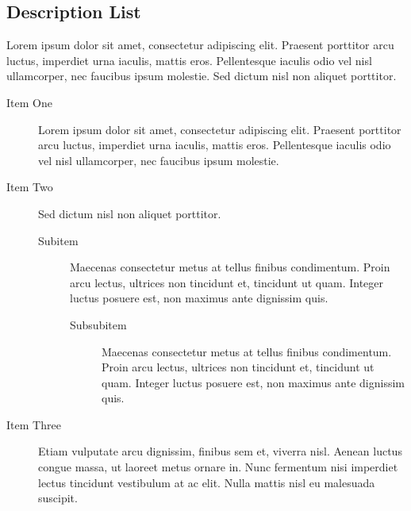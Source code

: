 
\subsection{Description List}

Lorem ipsum dolor sit amet, consectetur adipiscing elit. Praesent porttitor arcu luctus, imperdiet urna iaculis, mattis eros. Pellentesque iaculis odio vel nisl ullamcorper, nec faucibus ipsum molestie. Sed dictum nisl non aliquet porttitor.

\begin{description}
  \item[Item One] Lorem ipsum dolor sit amet, consectetur adipiscing elit. Praesent porttitor arcu luctus, imperdiet urna iaculis, mattis eros. Pellentesque iaculis odio vel nisl ullamcorper, nec faucibus ipsum molestie.
  \item[Item Two] Sed dictum nisl non aliquet porttitor.
    \begin{description}
      \item[Subitem] Maecenas consectetur metus at tellus finibus condimentum. Proin arcu lectus, ultrices non tincidunt et, tincidunt ut quam. Integer luctus posuere est, non maximus ante dignissim quis.
        \begin{description}
          \item[Subsubitem] Maecenas consectetur metus at tellus finibus condimentum. Proin arcu lectus, ultrices non tincidunt et, tincidunt ut quam. Integer luctus posuere est, non maximus ante dignissim quis.
        \end{description}
    \end{description}
  \item[Item Three] Etiam vulputate arcu dignissim, finibus sem et, viverra nisl. Aenean luctus congue massa, ut laoreet metus ornare in. Nunc fermentum nisi imperdiet lectus tincidunt vestibulum at ac elit. Nulla mattis nisl eu malesuada suscipit.
\end{description}

